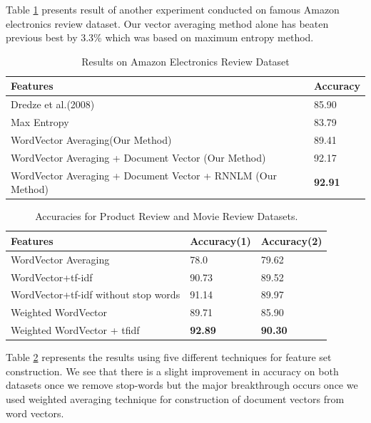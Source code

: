 \documentclass[11pt,a4paper]{article}
\begin{document}
Table \ref{table:amazon} presents result of another experiment conducted on famous Amazon electronics review dataset. Our vector averaging method alone has beaten previous best by 3.3\% which was based on maximum entropy method.
\begin {table}[H]
\centering
\small
\begin{tabular}{ | p{5.5cm} | p{1.2cm} | }
\hline
\textbf{Features} & \textbf{Accuracy} \\ \hline
Dredze et al.(2008) & 85.90\\ \hline
Max Entropy & 83.79\\ \hline
WordVector Averaging(Our Method) & 89.41\\ \hline
WordVector Averaging + Document Vector (Our Method) & 92.17\\ \hline
WordVector Averaging + Document Vector + RNNLM (Our Method) & \textbf{92.91}\\ \hline
\end{tabular}
\caption {Results on Amazon Electronics Review Dataset}
\label{table:amazon}
\end{table}

\begin {table}[h!]
\centering
\small
\begin{tabular}{ | p{3.5cm} | p{1.5cm} | p{1.5cm} | }
\hline
\textbf{Features} & \textbf{Accuracy(1)} & \textbf{Accuracy(2)} \\ \hline
WordVector Averaging & 78.0 & 79.62\\ \hline
WordVector+tf-idf & 90.73 & 89.52\\ \hline
WordVector+tf-idf without stop words & 91.14 & 89.97\\ \hline
Weighted WordVector & 89.71 & 85.90\\ \hline
Weighted WordVector + tfidf & \textbf{92.89} & \textbf{90.30}\\ \hline
\end{tabular}
\caption {Accuracies for Product Review and Movie Review Datasets.}
\label{table:hindi_ourmethods}
\end{table}

Table \ref{table:hindi_ourmethods} represents the results using five different techniques for feature set construction. We see that there is a slight improvement in accuracy on both datasets once we remove stop-words but the major breakthrough occurs once we used weighted averaging technique for construction of document vectors from word vectors.
\end{document}
